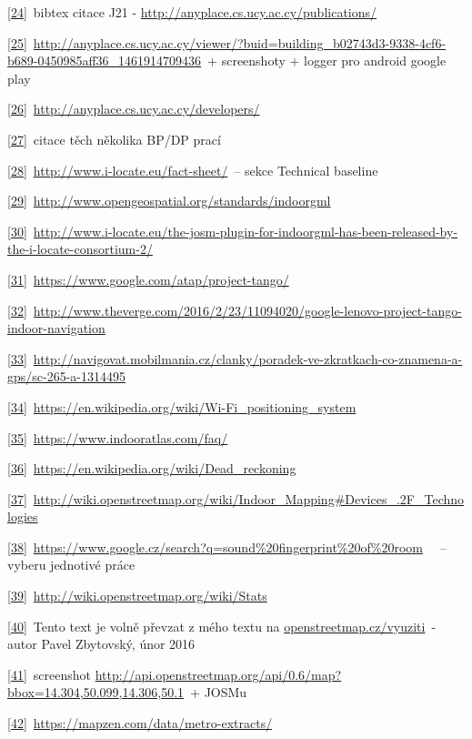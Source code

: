 \href{}{{[}24{]}}~bibtex citace J21 - \href{}{http://anyplace.cs.ucy.ac.cy/publications/}~

\href{}{{[}25{]}}~\href{}{http://anyplace.cs.ucy.ac.cy/viewer/?buid=building\_b02743d3-9338-4cf6-b689-0450985aff36\_1461914709436}~+ screenshoty + logger pro android google play

\href{}{{[}26{]}}~\href{}{http://anyplace.cs.ucy.ac.cy/developers/}~

\href{}{{[}27{]}}~citace těch několika BP/DP prací

\href{}{{[}28{]}}~\href{}{http://www.i-locate.eu/fact-sheet/}~-- sekce Technical baseline

\href{}{{[}29{]}}~\href{}{http://www.opengeospatial.org/standards/indoorgml}~

\href{}{{[}30{]}}~\href{}{http://www.i-locate.eu/the-josm-plugin-for-indoorgml-has-been-released-by-the-i-locate-consortium-2/}~

\href{}{{[}31{]}}~\href{}{https://www.google.com/atap/project-tango/}~

\href{}{{[}32{]}}~\href{}{http://www.theverge.com/2016/2/23/11094020/google-lenovo-project-tango-indoor-navigation}~

\href{}{{[}33{]}}~\href{}{http://navigovat.mobilmania.cz/clanky/poradek-ve-zkratkach-co-znamena-a-gps/sc-265-a-1314495}~

\href{}{{[}34{]}}~\href{}{https://en.wikipedia.org/wiki/Wi-Fi\_positioning\_system}~

\href{}{{[}35{]}}~\href{}{https://www.indooratlas.com/faq/}~

\href{}{{[}36{]}}~\href{}{https://en.wikipedia.org/wiki/Dead\_reckoning}~

\href{}{{[}37{]}}~\href{}{http://wiki.openstreetmap.org/wiki/Indoor\_Mapping\#Devices\_.2F\_Technologies}~

\href{}{{[}38{]}}~\href{}{https://www.google.cz/search?q=sound\%20fingerprint\%20of\%20room}~ ~-- vyberu jednotivé práce

\href{}{{[}39{]}}~\href{}{http://wiki.openstreetmap.org/wiki/Stats}~

\href{}{{[}40{]}}~Tento text je volně převzat z mého textu na \href{}{openstreetmap.cz/vyuziti}~- autor Pavel Zbytovský, únor 2016

\href{}{{[}41{]}}~screenshot \href{}{http://api.openstreetmap.org/api/0.6/map?bbox=14.304,50.099,14.306,50.1}~+ JOSMu

\href{}{{[}42{]}}~\href{}{https://mapzen.com/data/metro-extracts/}~

